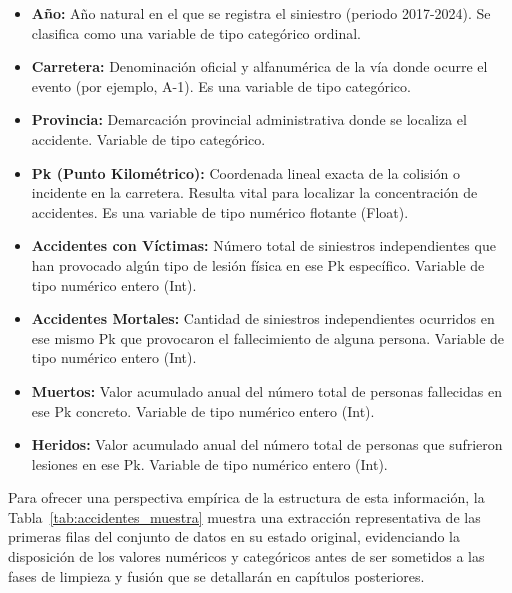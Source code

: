 \documentclass[twoside,a4paper,12pt,onecolumn,openany]{book}
\begin{document}
\begin{itemize}
\item \textbf{Año:} Año natural en el que se registra el siniestro (periodo 2017-2024). Se clasifica como una variable de tipo categórico ordinal.

\item \textbf{Carretera:} Denominación oficial y alfanumérica de la vía donde ocurre el evento (por ejemplo, A-1). Es una variable de tipo categórico.

\item \textbf{Provincia:} Demarcación provincial administrativa donde se localiza el accidente. Variable de tipo categórico.

\item \textbf{Pk (Punto Kilométrico):} Coordenada lineal exacta de la colisión o incidente en la carretera. Resulta vital para localizar la concentración de accidentes. Es una variable de tipo numérico flotante (Float).

\item \textbf{Accidentes con Víctimas:} Número total de siniestros independientes que han provocado algún tipo de lesión física en ese Pk específico. Variable de tipo numérico entero (Int).

\item \textbf{Accidentes Mortales:} Cantidad de siniestros independientes ocurridos en ese mismo Pk que provocaron el fallecimiento de alguna persona. Variable de tipo numérico entero (Int).
\item \textbf{Muertos:} Valor acumulado anual del número total de personas fallecidas en ese Pk concreto. Variable de tipo numérico entero (Int).
\item \textbf{Heridos:} Valor acumulado anual del número total de personas que sufrieron lesiones en ese Pk. Variable de tipo numérico entero (Int).
\end{itemize}

Para ofrecer una perspectiva empírica de la estructura de esta información, la Tabla~\ref{tab:accidentes_muestra} muestra una extracción representativa de las primeras filas del conjunto de datos en su estado original, evidenciando la disposición de los valores numéricos y categóricos antes de ser sometidos a las fases de limpieza y fusión que se detallarán en capítulos posteriores.
\end{document}

